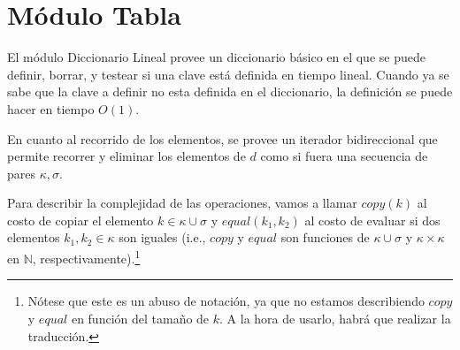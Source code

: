 \documentclass[a4paper,10pt]{article}
\begin{document}
\section{Módulo Tabla} 

El módulo Diccionario Lineal provee un diccionario básico en el que se puede definir, borrar, y testear si una clave está definida en tiempo lineal.  Cuando ya se sabe que la clave a definir no esta definida en el diccionario, la definición se puede hacer en tiempo $O(1)$.

En cuanto al recorrido de los elementos, se provee un iterador bidireccional que permite recorrer y eliminar los elementos de $d$ como si fuera una secuencia de pares $\kappa,\sigma$.

Para describir la complejidad de las operaciones, vamos a llamar $copy(k)$ al costo de copiar el elemento $k \in \kappa \cup \sigma$ y $equal(k_1, k_2)$ al costo de evaluar si dos elementos $k_1, k_2 \in \kappa$ son iguales (i.e., $copy$ y $equal$ son funciones de $\kappa \cup \sigma$ y $\kappa \times \kappa$ en $\mathbb{N}$, respectivamente).\footnote{Nótese que este es un abuso de notación, ya que no estamos describiendo $copy$ y $equal$ en función del tamaño de $k$.  A la hora de usarlo, habrá que realizar la traducción.}
\end{document}
